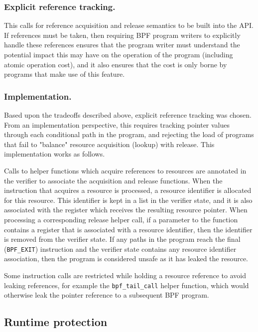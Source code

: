 \documentclass[10pt,sigconf,authorversion]{lpc}
\begin{document}
\subsubsection{Explicit reference tracking.}

This calls for reference acquisition and release semantics to be built into the
API. If references must be taken, then requiring BPF program writers to
explicitly handle these references ensures that the program writer must
understand the potential impact this may have on the operation of the program
(including atomic operation cost), and it also ensures that the cost is only
borne by programs that make use of this feature.

\subsubsection{Implementation.}

Based upon the tradeoffs described above, explicit reference tracking was
chosen. From an implementation perspective, this requires tracking pointer
values through each conditional path in the program, and rejecting the load of
programs that fail to "balance" resource acquisition (lookup) with release.
This implementation works as follows.

Calls to helper functions which acquire references to resources are annotated
in the verifier to associate the acquisition and release functions. When the
instruction that acquires a resource is processed, a resource identifier is
allocated for this resource. This identifier is kept in a list in the verifier
state, and it is also associated with the register which receives the resulting
resource pointer. When processing a corresponding release helper call, if a
parameter to the function contains a register that is associated with a
resource identifier, then the identifier is removed from the verifier state. If
any paths in the program reach the final (\verb+BPF_EXIT+) instruction and the
verifier state contains any resource identifier association, then the program
is considered unsafe as it has leaked the resource.

Some instruction calls are restricted while holding a resource reference to
avoid leaking references, for example the \verb+bpf_tail_call+ helper function,
which would otherwise leak the pointer reference to a subsequent BPF program.

\subsection{Runtime protection}
\end{document}
